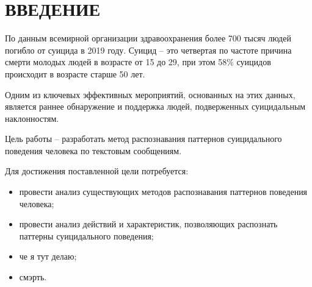 \section*{ВВЕДЕНИЕ}

По данным всемирной организации здравоохранения более 700 тысяч людей погибло от суицида в 2019 году. Суицид -- это четвертая по частоте причина смерти молодых людей в возрасте от 15 до 29, при этом 58\% суицидов происходит в возрасте старше 50 лет. \cite{suicideVOZ}

Одним из ключевых эффективных мероприятий, основанных на этих данных, является раннее обнаружение и поддержка людей, подверженных суицидальным наклонностям.

Цель работы -- разработать метод распознавания паттернов суицидального поведения человека по текстовым сообщениям.

Для достижения поставленной цели потребуется:
\begin{itemize}
	\item провести анализ существующих методов распознавания паттернов поведения человека;
	\item провести анализ действий и характеристик, позволяющих распознать паттерны суицидального поведения;
	\item че я тут делаю;
	\item смэрть.
\end{itemize}

\pagebreak